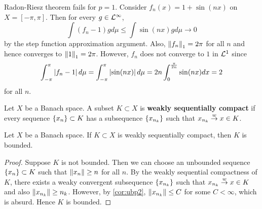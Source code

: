 \begin{remark}
    Radon-Riesz theorem fails for $p=1$. Consider $f_n(x) = 1+\sin(nx)$ on $X=[-\pi,\pi]$. 
    Then for every $g\in\mathcal{L}^\infty$, 
    \begin{equation*}
        \int (f_n - 1)gd\mu \leq \int \sin(nx)gd\mu \to 0
    \end{equation*}
    by the step function approximation argument. Also, $\left\lVert {f_n} \right\rVert_1 = 2\pi$ for all $n$ and 
    hence converges to $\left\lVert {1} \right\rVert_1 = 2\pi$. However, $f_n$ does not converge to $1$ in $\mathcal{L}^1$ 
    since 
    \begin{equation*}
        \int_{-\pi}^{\pi} \left\lvert {f_n-1} \right\rvert d\mu = \int_{-\pi}^{\pi} \left\lvert {\sin(nx)} \right\rvert d\mu  
        = 2n\int_{0}^{\frac{\pi}{2n}} \sin(nx)dx = 2
    \end{equation*}
    for all $n$.
\end{remark}

\begin{definition}
    Let $X$ be a Banach space. A subset $K\subset X$ is \textbf{weakly sequentially compact} 
    if every sequence $\left\{ {x_n} \right\}\subset K$ has a subsequence $\left\{ {x_{n_k}} \right\}$ such that 
    $x_{n_k}\overset{w}{\to} x\in K$.
\end{definition}

\begin{proposition}\label{prop:w_seq_cpt_bd}
    Let $X$ be a Banach space. If $K\subset X$ is weakly sequentially compact, then 
    $K$ is bounded.
\end{proposition}
\begin{proof}
    Suppose $K$ is not bounded. Then we can choose an unbounded sequence 
    $\left\{ {x_n} \right\}\subset K$ such that $\left\lVert {x_n} \right\rVert\geq n$ for all $n$. By the 
    weakly sequential compactness of $K$, there exists a weaky convergent 
    subsequence $\left\{ {x_{n_k}} \right\}$ such that $x_{n_k}\overset{w}{\to} x\in K$ and also 
    $\left\lVert {x_{n_k}} \right\rVert\geq n_k$. However, by \cref{cor:ubp2}, $\left\lVert {x_{n_k}} \right\rVert\leq C$ 
    for some $C<\infty$, which is absurd. Hence $K$ is bounded.
\end{proof}

